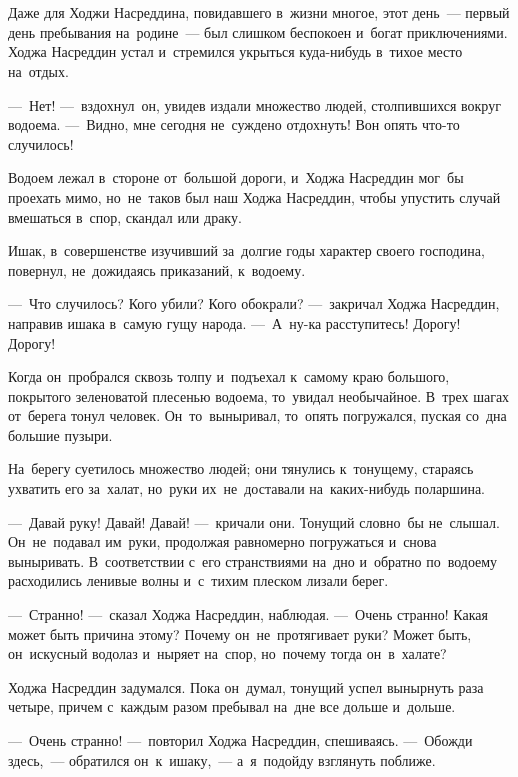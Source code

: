 \documentclass[12pt,a4paper]{book}
\begin{document}
\chapter{}

Даже для Ходжи Насреддина, повидавшего в~жизни многое, этот день~— первый день пребывания на~родине~— был слишком беспокоен и~богат приключениями. Ходжа Насреддин устал и~стремился укрыться куда-нибудь в~тихое место на~отдых.

—~Нет! —~вздохнул~он, увидев издали множество людей, столпившихся вокруг водоема. —~Видно, мне сегодня не~суждено отдохнуть! Вон опять что-то случилось!

Водоем лежал в~стороне от~большой дороги, и~Ходжа Насреддин мог~бы проехать мимо, но~не~таков был наш Ходжа Насреддин, чтобы упустить случай вмешаться в~спор, скандал или драку.

Ишак, в~совершенстве изучивший за~долгие годы характер своего господина, повернул, не~дожидаясь приказаний, к~водоему.

—~Что случилось? Кого убили? Кого обокрали? —~закричал Ходжа Насреддин, направив ишака в~самую гущу народа. —~А~ну-ка расступитесь! Дорогу! Дорогу!

Когда он~пробрался сквозь толпу и~подъехал к~самому краю большого, покрытого зеленоватой плесенью водоема, то~увидал необычайное. В~трех шагах от~берега тонул человек. Он~то~выныривал, то~опять погружался, пуская со~дна большие пузыри.

На~берегу суетилось множество людей; они тянулись к~тонущему, стараясь ухватить его за~халат, но~руки их~не~доставали на~каких-нибудь поларшина.

—~Давай руку! Давай! Давай! —~кричали они. Тонущий словно~бы не~слышал. Он~не~подавал им~руки, продолжая равномерно погружаться и~снова выныривать. В~соответствии с~его странствиями на~дно и~обратно по~водоему расходились ленивые волны и~с~тихим плеском лизали берег.

—~Странно! —~сказал Ходжа Насреддин, наблюдая. —~Очень странно! Какая может быть причина этому? Почему он~не~протягивает руки? Может быть, он~искусный водолаз и~ныряет на~спор, но~почему тогда он~в~халате?

Ходжа Насреддин задумался. Пока он~думал, тонущий успел вынырнуть раза четыре, причем с~каждым разом пребывал на~дне все дольше и~дольше.

—~Очень странно! —~повторил Ходжа Насреддин, спешиваясь. —~Обожди здесь,~— обратился он~к~ишаку,~— а~я~подойду взглянуть поближе.
\end{document}
